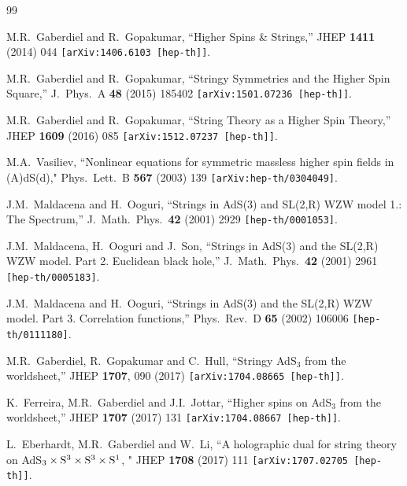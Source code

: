 \documentclass[12pt,a4paper]{article}
\begin{document}
\begin{thebibliography}{99}

M.R.~Gaberdiel and R.~Gopakumar,
``Higher Spins \& Strings,''
JHEP {\bf 1411} (2014) 044
{\tt [arXiv:1406.6103 [hep-th]]}.

M.R.~Gaberdiel and R.~Gopakumar,
``Stringy Symmetries and the Higher Spin Square,''
J.\ Phys.\ A {\bf 48} (2015) 185402
{\tt [arXiv:1501.07236 [hep-th]]}.

M.R.~Gaberdiel and R.~Gopakumar,
``String Theory as a Higher Spin Theory,''
JHEP {\bf 1609} (2016) 085
{\tt [arXiv:1512.07237 [hep-th]]}.

M.A.~Vasiliev,
``Nonlinear equations for symmetric massless higher spin fields in (A)dS(d),"
Phys.\ Lett.\  B {\bf 567} (2003) 139
{\tt [arXiv:hep-th/0304049]}.

J.M.~Maldacena and H.~Ooguri,
``Strings in AdS(3) and SL(2,R) WZW model 1.: The Spectrum,''
J.\ Math.\ Phys.\  {\bf 42} (2001) 2929
{\tt  [hep-th/0001053]}.

J.M.~Maldacena, H.~Ooguri and J.~Son,
``Strings in AdS(3) and the SL(2,R) WZW model. Part 2. Euclidean black hole,''
J.\ Math.\ Phys.\  {\bf 42} (2001) 2961
{\tt  [hep-th/0005183]}.

J.M.~Maldacena and H.~Ooguri,
``Strings in AdS(3) and the SL(2,R) WZW model. Part 3. Correlation functions,''
Phys.\ Rev.\ D {\bf 65} (2002) 106006
{\tt [hep-th/0111180]}.

M.R.~Gaberdiel, R.~Gopakumar and C.~Hull,
 ``Stringy AdS$_{3}$ from the worldsheet,''
 JHEP {\bf 1707}, 090 (2017)
{\tt [arXiv:1704.08665 [hep-th]]}.
  
K.~Ferreira, M.R.~Gaberdiel and J.I.~Jottar,
``Higher spins on AdS$_{3}$ from the worldsheet,''
JHEP {\bf 1707} (2017) 131
{\tt [arXiv:1704.08667 [hep-th]]}.

L.~Eberhardt, M.R.~Gaberdiel and W.~Li,
``A holographic dual for string theory on AdS$_3 \times {\rm S}^3 \times {\rm S}^3 \times {\rm S}^1$, "
JHEP {\bf 1708} (2017) 111
{\tt [arXiv:1707.02705 [hep-th]]}.


\end{thebibliography}
\end{document}
